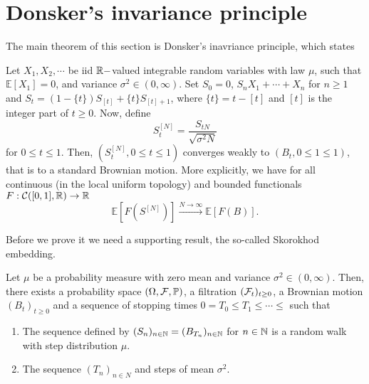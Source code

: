 \documentclass{article}
\begin{document}
	\section{Donsker's invariance principle}\label{sec: Donsker}
The main theorem of this section is Donsker's inavriance principle, which states 
\begin{theorem}\label{thm: donsker}
	Let $ X_{1}, X_{2}, \cdots$ be iid $ \mathbb{R}-$valued integrable random variables with law $ \mu$, such that $ \mathbb{E}\left[ X_{1} \right]=0$, and variance $ \sigma^{2}\in (0,\infty)$. Set $ S_{0}=0$, $ S_{n} X_{1}+\cdots +X_{n}$ for $ n\geq 1$ and $ S_{t} = (1-\{t\})S_{[t]}+\{t\}S_{[t]+1}$, where $ \{t\}= t-[t]$ and $ [t]$ is the integer part of $ t\geq 0$. Now, define 
	\[
		S^{[N]}_{t} = \frac{S_{tN}}{\sqrt{\sigma^{2}N}}
	\]
	for $ 0\leq t\leq 1$. Then, $ \left(  S^{[N]}_{t}, 0\leq t\leq 1\right)$ converges weakly to $ (B_{t}, 0\leq 1\leq 1)$, that is to a standard Brownian motion. More explicitly, we have for all continuous (in the local uniform topology) and bounded functionals $ F: \mathcal{C}([0,1], \mathbb{R})\to \mathbb{R}$
	\[
	\mathbb{E}\left[ F(S^{[N]}) \right] \stackrel{N\to \infty}{\longrightarrow} \mathbb{E}\left[ F(B) \right].
	\]
\end{theorem}
	Before we prove it we need a supporting result, the so-called Skorokhod embedding.

	\begin{theorem}\label{thm: skorokhod embedding}
	Let $ \mu$ be a probability measure with zero mean and variance $ \sigma^{2}\in (0,\infty)$. Then, there exists a probability space $ (\Omega, \mathcal{F}, \mathbb{P})$, a filtration $ (\mathcal{F}_{t})_{t\geq 0}$, a Brownian motion $ (B_{t})_{t\geq 0}$ and a sequence of stopping times $ 0=T_{0}\leq T_{1}\leq \cdots\leq$ such that
	\begin{enumerate}
		\item The sequence defined by $ (S_{n})_{n\in \mathbb{N}} = (B_{T_{n}})_{n\in \mathbb{N}}$ for $ n\in \mathbb{N}$ is a random walk with step distribution $ \mu$.
		\item The sequence $ (T_{n})_{n\in N}$ and steps of mean $ \sigma^{2}$.
 
	\end{enumerate}


\end{theorem}
\end{document}
